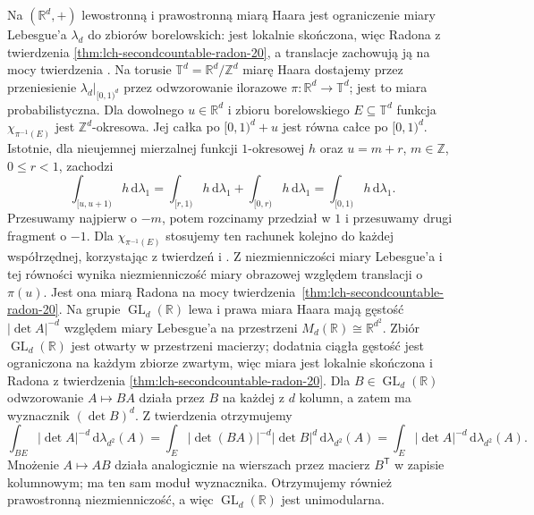 \begin{przyklad}
\label{ex:haar-standard-23}
Na $(\mathbb R^d,+)$ lewostronną i prawostronną miarą
Haara jest ograniczenie miary Lebesgue'a $\lambda_d$
do zbiorów borelowskich: jest lokalnie skończona,
więc Radona z twierdzenia
\ref{thm:lch-secondcountable-radon-20}, a translacje
zachowują ją na mocy twierdzenia
.
Na torusie $\mathbb T^d=\mathbb R^d/\mathbb Z^d$
miarę Haara dostajemy przez przeniesienie
$\lambda_d|_{[0,1)^d}$ przez odwzorowanie ilorazowe
$\pi:\mathbb R^d\to\mathbb T^d$; jest to miara
probabilistyczna. Dla dowolnego $u\in\mathbb R^d$
i zbioru borelowskiego $E\subseteq\mathbb T^d$
funkcja $\chi_{\pi^{-1}(E)}$ jest $\mathbb Z^d$-okresowa.
Jej całka po $[0,1)^d+u$ jest równa całce po $[0,1)^d$.
Istotnie, dla nieujemnej mierzalnej funkcji
$1$-okresowej $h$ oraz $u=m+r$, $m\in\mathbb Z$,
$0\le r<1$, zachodzi
\[
 \int_{[u,u+1)}h\,\mathrm d\lambda_1
 =\int_{[r,1)}h\,\mathrm d\lambda_1
  +\int_{[0,r)}h\,\mathrm d\lambda_1
 =\int_{[0,1)}h\,\mathrm d\lambda_1.
\]
Przesuwamy najpierw o $-m$, potem rozcinamy przedział
w $1$ i przesuwamy drugi fragment o $-1$.
Dla $\chi_{\pi^{-1}(E)}$ stosujemy ten rachunek
kolejno do każdej współrzędnej, korzystając z twierdzeń
 i .
Z niezmienniczości miary Lebesgue'a i tej równości
wynika niezmienniczość miary obrazowej względem
translacji o $\pi(u)$. Jest ona miarą Radona na mocy
twierdzenia~\ref{thm:lch-secondcountable-radon-20}. Na grupie
$\operatorname{GL}_d(\mathbb R)$ lewa i prawa miara Haara
mają gęstość $|\det A|^{-d}$ względem miary
Lebesgue'a na przestrzeni $M_d(\mathbb R)\cong\mathbb R^{d^2}$.
Zbiór $\operatorname{GL}_d(\mathbb R)$ jest otwarty
w przestrzeni macierzy; dodatnia ciągła gęstość
jest ograniczona na każdym zbiorze zwartym,
więc miara jest lokalnie skończona i Radona z
twierdzenia \ref{thm:lch-secondcountable-radon-20}.
Dla $B\in\operatorname{GL}_d(\mathbb R)$
odwzorowanie $A\mapsto BA$ działa przez $B$
na każdej z $d$ kolumn, a zatem ma wyznacznik
$({\det B})^d$. Z twierdzenia
 otrzymujemy
\[
 \int_{BE}|\det A|^{-d}\,\mathrm d\lambda_{d^2}(A)
 =\int_E|\det(BA)|^{-d}|\det B|^d
       \,\mathrm d\lambda_{d^2}(A)
 =\int_E|\det A|^{-d}\,\mathrm d\lambda_{d^2}(A).
\]
Mnożenie $A\mapsto AB$ działa analogicznie na
wierszach przez macierz $B^{\mathsf T}$ w zapisie
kolumnowym; ma ten sam moduł wyznacznika.
Otrzymujemy również prawostronną niezmienniczość,
a więc $\operatorname{GL}_d(\mathbb R)$ jest
unimodularna.
\end{przyklad}


